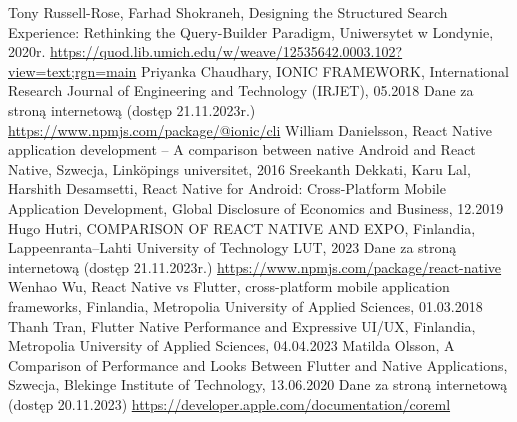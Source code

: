 \documentclass[12pt, a4paper, twoside, openany]{book}
\begin{document}
\begin{thebibliography}{9}
    Tony Russell-Rose, Farhad Shokraneh, Designing the Structured Search Experience: Rethinking the Query-Builder Paradigm, Uniwersytet w Londynie, 2020r. \url{https://quod.lib.umich.edu/w/weave/12535642.0003.102?view=text;rgn=main}
     Priyanka Chaudhary, IONIC FRAMEWORK, International Research Journal of Engineering and Technology (IRJET), 05.2018
     Dane za stroną internetową (dostęp 21.11.2023r.) \url{https://www.npmjs.com/package/@ionic/cli}
     William Danielsson, React Native application development – A comparison between native Android and React Native, Szwecja, Linköpings universitet, 2016
     Sreekanth Dekkati, Karu Lal, Harshith Desamsetti, React Native for Android: Cross-Platform Mobile Application Development, Global Disclosure of Economics and Business, 12.2019
     Hugo Hutri, COMPARISON OF REACT NATIVE AND EXPO, Finlandia, Lappeenranta–Lahti University of Technology LUT, 2023
     Dane za stroną internetową (dostęp 21.11.2023r.) \url{https://www.npmjs.com/package/react-native}
     Wenhao Wu, React Native vs Flutter, cross-platform mobile application frameworks, Finlandia, Metropolia University of Applied Sciences, 01.03.2018
     Thanh Tran, Flutter Native Performance and Expressive UI/UX, Finlandia, Metropolia University of Applied Sciences, 04.04.2023
     Matilda Olsson, A Comparison of Performance and Looks Between Flutter and Native Applications, Szwecja, Blekinge Institute of Technology, 13.06.2020
     Dane za stroną internetową (dostęp 20.11.2023) \url{https://developer.apple.com/documentation/coreml}
    
    \end{thebibliography}
\end{document}
